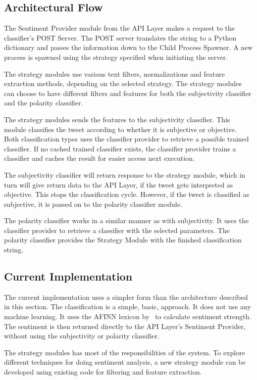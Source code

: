 \subsection{Architectural Flow}

The Sentiment Provider module from the API Layer makes a request to the classifier's POST Server. The POST server translates the string to a Python dictionary and passes the information down to the Child Process Spawner. A new process is spawned using the strategy specified when initiating the server. 

The strategy modules use various text filters, normalizations and feature extraction methods, depending on the selected strategy. The strategy modules can choose to have different filters and features for both the subjectivity classifier and the polarity classifier. 

The strategy modules sends the features to the subjectivity classifier. This module classifies the tweet according to whether it is subjective or objective. Both classification types uses the classifier provider to retrieve a possible trained classifier. If no cached trained classifier exists, the classifier provider trains a classifier and caches the result for easier access next execution. 

The subjectivity classifier will return response to the strategy module, which in turn will give return data to the API Layer, if the tweet gets interpreted as objective. This stops the classification cycle. However, if the tweet is classified as subjective, it is passed on to the polarity classifier module. 

The polarity classifier works in a similar manner as with subjectivity. It uses the classifier provider to retrieve a classifier with the selected parameters. The polarity classifier provides the Strategy Module with the finished classification string.


\subsection{Current Implementation}

The current implementation uses a simpler form than the architecture described in this section. The classification is a simple, basic, approach. It does not use any machine learning. It uses the AFINN lexicon by~\cite{article:afinn} to calculate sentiment strength. The sentiment is then returned directly to the API Layer's Sentiment Provider, without using the subjectivity or polarity classifier.

The strategy modules has most of the responsibilities of the system. To explore different techniques for doing sentiment analysis, a new strategy module can be developed using existing code for filtering and feature extraction. 
